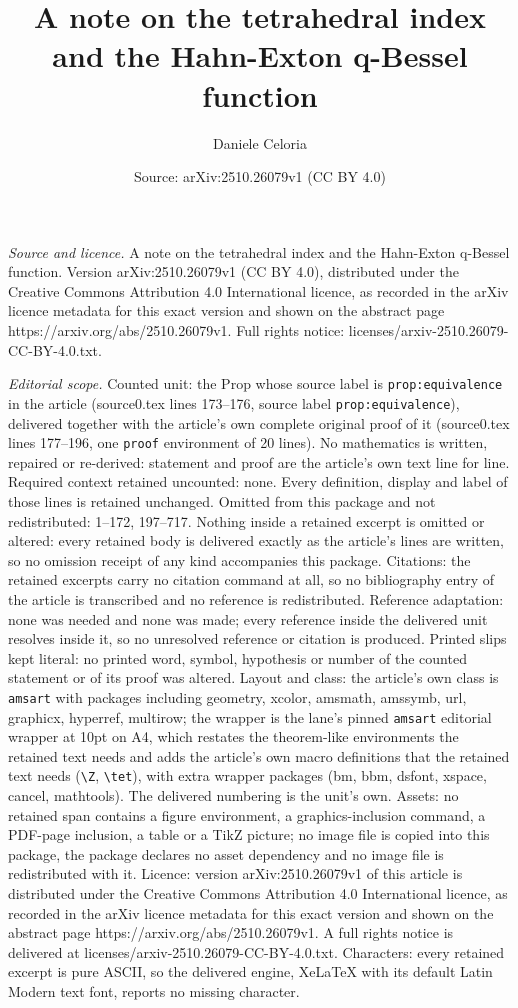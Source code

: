 \documentclass[10pt,a4paper]{amsart}
\title[A note on the tetrahedral index and the Hahn-Exton q-Bessel ]{A note on the tetrahedral index and the Hahn-Exton q-Bessel function}
\author{Daniele Celoria}
\date{Source: arXiv:2510.26079v1 (CC BY 4.0)}
\begin{document}
\maketitle

\noindent\emph{Source and licence.} A note on the tetrahedral index and the Hahn-Exton q-Bessel function. Version arXiv:2510.26079v1 (CC BY 4.0), distributed under the Creative Commons Attribution 4.0 International licence, as recorded in the arXiv licence metadata for this exact version and shown on the abstract page https://arxiv.org/abs/2510.26079v1. Full rights notice: licenses/arxiv-2510.26079-CC-BY-4.0.txt.\par\smallskip

\noindent\textit{Editorial scope.} Counted unit: the Prop whose source label is \texttt{prop:equivalence} in the article (source0.tex lines 173--176, source label \texttt{prop:equivalence}), delivered together with the article's own complete original proof of it (source0.tex lines 177--196, one \texttt{proof} environment of 20 lines). No mathematics is written, repaired or re-derived: statement and proof are the article's own text line for line. Required context retained uncounted: none. Every definition, display and label of those lines is retained unchanged. Omitted from this package and not redistributed: 1--172, 197--717. Nothing inside a retained excerpt is omitted or altered: every retained body is delivered exactly as the article's lines are written, so no omission receipt of any kind accompanies this package. Citations: the retained excerpts carry no citation command at all, so no bibliography entry of the article is transcribed and no reference is redistributed. Reference adaptation: none was needed and none was made; every reference inside the delivered unit resolves inside it, so no unresolved reference or citation is produced. Printed slips kept literal: no printed word, symbol, hypothesis or number of the counted statement or of its proof was altered. Layout and class: the article's own class is \texttt{amsart} with packages including geometry, xcolor, amsmath, amssymb, url, graphicx, hyperref, multirow; the wrapper is the lane's pinned \texttt{amsart} editorial wrapper at 10pt on A4, which restates the theorem-like environments the retained text needs and adds the article's own macro definitions that the retained text needs (\texttt{\textbackslash Z}, \texttt{\textbackslash tet}), with extra wrapper packages (bm, bbm, dsfont, xspace, cancel, mathtools). The delivered numbering is the unit's own. Assets: no retained span contains a figure environment, a graphics-inclusion command, a PDF-page inclusion, a table or a TikZ picture; no image file is copied into this package, the package declares no asset dependency and no image file is redistributed with it. Licence: version arXiv:2510.26079v1 of this article is distributed under the Creative Commons Attribution 4.0 International licence, as recorded in the arXiv licence metadata for this exact version and shown on the abstract page https://arxiv.org/abs/2510.26079v1. A full rights notice is delivered at licenses/arxiv-2510.26079-CC-BY-4.0.txt. Characters: every retained excerpt is pure ASCII, so the delivered engine, XeLaTeX with its default Latin Modern text font, reports no missing character.
\end{document}
